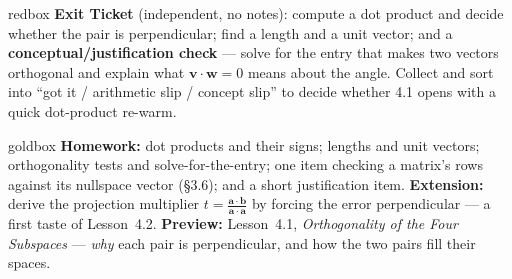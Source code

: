 \documentclass[10pt]{article}
\newcommand{\vv}{\mathbf{v}}
\newcommand{\ww}{\mathbf{w}}
\begin{document}
\begin{skillbox}{redbox}
\textbf{Exit Ticket} (independent, no notes): compute a dot product and decide whether the pair is
perpendicular; find a length and a unit vector; and a \textbf{conceptual/justification check} ---
solve for the entry that makes two vectors orthogonal and explain what $\vv\cdot\ww=0$ means about
the angle. Collect and sort into ``got it / arithmetic slip / concept slip'' to decide whether 4.1
opens with a quick dot-product re-warm.
\end{skillbox}

\begin{skillbox}{goldbox}
\textbf{Homework:} dot products and their signs; lengths and unit vectors; orthogonality tests and
solve-for-the-entry; one item checking a matrix's rows against its nullspace vector (§3.6); and a
short justification item. \textbf{Extension:} derive the projection multiplier
$t=\frac{\mathbf a\cdot\mathbf b}{\mathbf a\cdot\mathbf a}$ by forcing the error perpendicular --- a
first taste of Lesson~4.2. \textbf{Preview:} Lesson~4.1, \emph{Orthogonality of the Four Subspaces}
--- \emph{why} each pair is perpendicular, and how the two pairs fill their spaces.
\end{skillbox}
\end{document}
